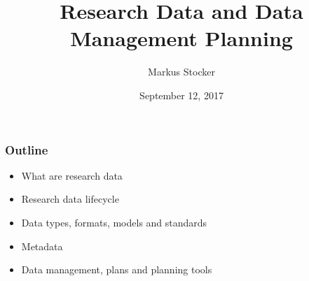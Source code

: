 \documentclass{beamer}
\title{Research Data and Data Management Planning}
\author{Markus Stocker}
\date{September 12, 2017}
\begin{document}
\maketitle

\begin{frame}
  \frametitle{Outline}
  
  \begin{itemize}
  \item What are research data
  \item Research data lifecycle
  \item Data types, formats, models and standards
  \item Metadata
  \item Data management, plans and planning tools
  \end{itemize}
\end{frame}

{
	\begin{frame}[plain]
	\end{frame}
}
\end{document}
